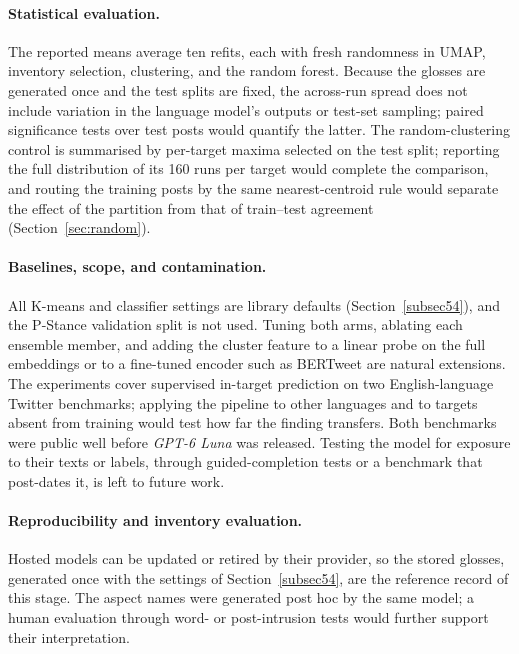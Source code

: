 \documentclass[pdflatex,sn-mathphys-num,iicol]{sn-jnl}%
\begin{document}
\paragraph{Statistical evaluation.} The reported means average ten refits, each with fresh randomness in UMAP, inventory selection, clustering, and the random forest. Because the glosses are generated once and the test splits are fixed, the across-run spread does not include variation in the language model's outputs or test-set sampling; paired significance tests over test posts \cite{dror2018hitchhiker} would quantify the latter. The random-clustering control is summarised by per-target maxima selected on the test split; reporting the full distribution of its 160 runs per target would complete the comparison, and routing the training posts by the same nearest-centroid rule would separate the effect of the partition from that of train--test agreement (Section~\ref{sec:random}).

\paragraph{Baselines, scope, and contamination.} All K-means and classifier settings are library defaults (Section~\ref{subsec54}), and the P-Stance validation split is not used. Tuning both arms, ablating each ensemble member, and adding the cluster feature to a linear probe on the full embeddings or to a fine-tuned encoder such as BERTweet \cite{nguyen2020bertweet} are natural extensions. The experiments cover supervised in-target prediction on two English-language Twitter benchmarks; applying the pipeline to other languages and to targets absent from training would test how far the finding transfers. Both benchmarks were public well before \textit{GPT-6 Luna} was released. Testing the model for exposure to their texts or labels, through guided-completion tests \cite{golchin2024time} or a benchmark that post-dates it, is left to future work.

\paragraph{Reproducibility and inventory evaluation.} Hosted models can be updated or retired by their provider, so the stored glosses, generated once with the settings of Section~\ref{subsec54}, are the reference record of this stage. The aspect names were generated post hoc by the same model; a human evaluation through word- or post-intrusion tests \cite{chang2009tea} would further support their interpretation.
\end{document}
